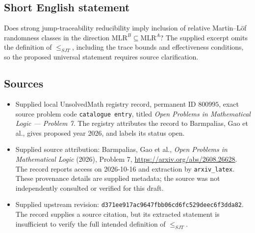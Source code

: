 \documentclass[11pt]{article}
\begin{document}
\subsection{Short English statement}
Does strong jump-traceability reducibility imply inclusion of relative Martin--L\"of randomness classes in the direction \(\mathrm{MLR}^{B}\subseteq\mathrm{MLR}^{A}\)? The supplied excerpt omits the definition of \(\le_{SJT}\), including the trace bounds and effectiveness conditions, so the proposed universal statement requires source clarification.
\subsection{Sources}
\begin{itemize}
\item Supplied local UnsolvedMath registry record, permanent ID \(800995\), exact source problem code \texttt{catalogue entry}, titled \emph{Open Problems in Mathematical Logic --- Problem 7}. The registry attributes the record to Barmpalias, Gao et al., gives proposed year 2026, and labels its status open.
\item Supplied source attribution: Barmpalias, Gao et al., \emph{Open Problems in Mathematical Logic} (2026), Problem 7, \url{https://arxiv.org/abs/2608.26628}. The record reports access on 2026-10-16 and extraction by \texttt{arxiv\_latex}. These provenance details are supplied metadata; the source was not independently consulted or verified for this draft.
\item Supplied upstream revision: \texttt{d371ee917ac9647fbb06cd6fc529deec6f3dda82}. The record supplies a source citation, but its extracted statement is insufficient to verify the full intended definition of \(\le_{SJT}\).
\end{itemize}
\end{document}
